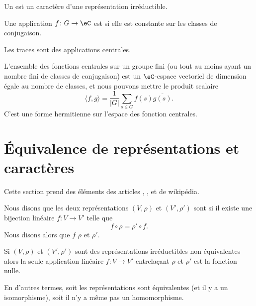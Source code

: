 Un  est un caractère d'une représentation irréductible.

\begin{definition}
    Une application \( f\colon G\to \eC\) est  si elle est constante sur les classes de conjugaison.
\end{definition}
Les traces sont des applications centrales.

L'ensemble des fonctions centrales sur un groupe fini (ou tout au moins ayant un nombre fini de classes de conjugaison) est un \( \eC\)-espace vectoriel de dimension égale au nombre de classes, et nous pouvons mettre le produit scalaire
\begin{equation}    \label{EqJrEpVI}
    \langle f, g\rangle =\frac{1}{ | G | }\sum_{s\in G}f(s)\overline{ g(s) }.
\end{equation}
C'est une forme hermitienne sur l'espace des fonction centrales.

\section{Équivalence de représentations et caractères}

Cette section prend des éléments des articles , ,  et  de wikipédia.

Nous disons que les deux représentations \( (V,\rho)\) et \( (V',\rho')\) sont  si il existe une bijection linéaire \( f\colon V\to V'\) telle que
\begin{equation}
    f\circ \rho=\rho'\circ f.
\end{equation}
Nous disons alors que \( f\)  \( \rho\) et \( \rho'\).

\begin{theorem}    \label{ThoyftobH}
    Si \( (V,\rho)\) et \( (V',\rho')\) sont des représentations irréductibles non équivalentes alors la seule application linéaire \( f\colon V\to V'\) entrelaçant \( \rho\) et \( \rho'\) est la fonction nulle.

    En d'autres termes, soit les représentations sont équivalentes (et il y a un isomorphisme), soit il n'y a même pas un homomorphisme.
\end{theorem}

